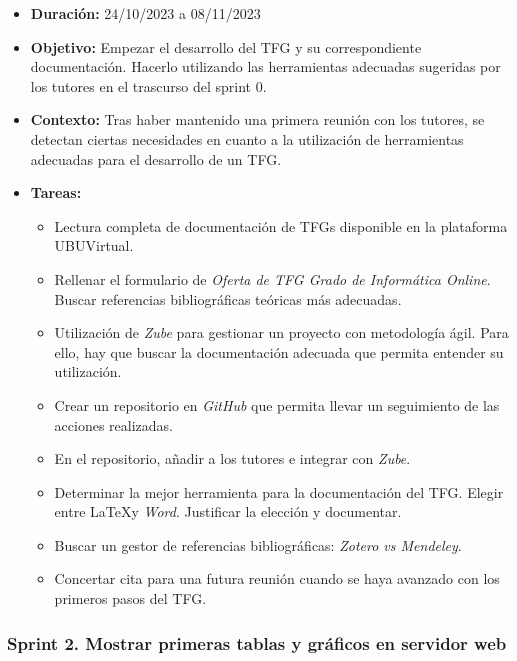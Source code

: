 \begin{itemize}
\item  
\textbf{Duración:} 24/10/2023 a 08/11/2023

\item
\textbf{Objetivo:} Empezar el desarrollo del TFG y su correspondiente documentación. Hacerlo utilizando las herramientas adecuadas sugeridas por los tutores en el trascurso del sprint 0. 

\item
\textbf{Contexto:} Tras haber mantenido una primera reunión con los tutores, se detectan ciertas necesidades en cuanto a la utilización de herramientas adecuadas para el desarrollo de un TFG. 

\item
\textbf{Tareas:}
	\begin{itemize}
	\tightlist
	\item 
	Lectura completa de documentación de TFGs disponible en la plataforma UBUVirtual. 
	\item 	
	Rellenar el formulario de \emph{Oferta de TFG Grado de Informática Online}. Buscar referencias bibliográficas teóricas más adecuadas. 
	\item 
	Utilización de \emph{Zube}\citep{online:zube} para gestionar un proyecto con metodología ágil. Para ello, hay que buscar la documentación adecuada que permita entender su utilización.
  	\item 
  	Crear un repositorio en \emph{GitHub} que permita llevar un seguimiento de las acciones realizadas. 
  	\item 
  	En el repositorio, añadir a los tutores e integrar con \emph{Zube}. 
	\item 
	Determinar la mejor herramienta para la documentación del TFG. Elegir entre \LaTeX y \emph{Word}. Justificar la elección y documentar. 
  	\item 
  	Buscar un gestor de referencias bibliográficas: \emph{Zotero vs Mendeley}. 
  	\item 
  	Concertar cita para una futura reunión cuando se haya avanzado con los primeros pasos del TFG.
  	\end{itemize}
\end{itemize}


\subsubsection{Sprint 2. Mostrar primeras tablas y gráficos en servidor web}

